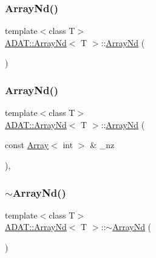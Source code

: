 \subsubsection{\texorpdfstring{ArrayNd()}{ArrayNd()}\hspace{0.1cm}{\footnotesize\ttfamily [4/9]}}
{\footnotesize\ttfamily template$<$class T$>$ \\
\mbox{\hyperlink{classADAT_1_1ArrayNd}{A\+D\+A\+T\+::\+Array\+Nd}}$<$ T $>$\+::\mbox{\hyperlink{classADAT_1_1ArrayNd}{Array\+Nd}} (\begin{DoxyParamCaption}{ }\end{DoxyParamCaption})\hspace{0.3cm}{\ttfamily [inline]}}

\mbox{\label{classADAT_1_1ArrayNd_aea668cd9a67b06d552e4acb9a7dec98c}} 
\subsubsection{\texorpdfstring{ArrayNd()}{ArrayNd()}\hspace{0.1cm}{\footnotesize\ttfamily [5/9]}}
{\footnotesize\ttfamily template$<$class T$>$ \\
\mbox{\hyperlink{classADAT_1_1ArrayNd}{A\+D\+A\+T\+::\+Array\+Nd}}$<$ T $>$\+::\mbox{\hyperlink{classADAT_1_1ArrayNd}{Array\+Nd}} (\begin{DoxyParamCaption}\item[{const \mbox{\hyperlink{classXMLArray_1_1Array}{Array}}$<$ int $>$ \&}]{\+\_\+nz }\end{DoxyParamCaption})\hspace{0.3cm}{\ttfamily [inline]}, {\ttfamily [explicit]}}

\mbox{\label{classADAT_1_1ArrayNd_a040990cb205b2c2b5eb2f5d0594408b9}} 
\subsubsection{\texorpdfstring{$\sim$ArrayNd()}{~ArrayNd()}\hspace{0.1cm}{\footnotesize\ttfamily [2/3]}}
{\footnotesize\ttfamily template$<$class T$>$ \\
\mbox{\hyperlink{classADAT_1_1ArrayNd}{A\+D\+A\+T\+::\+Array\+Nd}}$<$ T $>$\+::$\sim$\mbox{\hyperlink{classADAT_1_1ArrayNd}{Array\+Nd}} (\begin{DoxyParamCaption}{ }\end{DoxyParamCaption})\hspace{0.3cm}{\ttfamily [inline]}}

